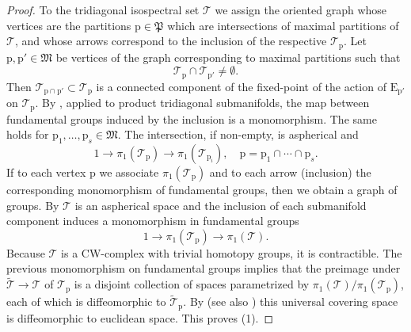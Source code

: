 \documentclass[reqno]{amsart}
\newcommand{\p}{\mathrm{p}}
\newcommand{\cT}{\mathcal{T}}
\newcommand{\E}{\mathrm{E}}
\begin{document}
\begin{proof}
To the tridiagonal isospectral set $\cT$ we assign the oriented graph whose vertices are the partitions $\p\in \mathfrak{P}$ which are intersections of maximal partitions of $\cT$, and whose arrows correspond to the inclusion of the respective $\cT_\p$.
Let $\p,\p'\in \mathfrak{M}$ be vertices of the graph corresponding to maximal partitions such that
\[\cT_{\p}\cap \cT_{\p'} \neq\emptyset.\]
Then $\cT_{\p\cap \p'}\subset \cT_\p$ is a connected component of the fixed-point
of the action of $\E_{\p'}$ on $\cT_\p$. By \cite[Lemma 7.1]{Da2}, applied to product tridiagonal submanifolds, the map between fundamental groups induced by the inclusion  is a monomorphism. The same holds for $\p_1,\dots,\p_s\in \mathfrak{M}$. The intersection, if non-empty, is aspherical
and
\[1\to \pi_1(\cT_\p)\to \pi_{1}(\cT_{\p_i}),\quad \p=\p_1\cap\cdots\cap \p_s.\]
If to each vertex $\p$ we associate $\pi_1(\cT_\p)$ and to each arrow (inclusion) the corresponding monomorphism of fundamental groups, then we obtain a graph of groups. By \cite[Theorem 1B.11]{Ha} $\cT$ is an aspherical space and the inclusion of each submanifold component induces a monomorphism in fundamental groups
\[1\to \pi_1(\cT_\p)\to \pi_{1}(\cT).\]
Because $\cT$ is a CW-complex with trivial homotopy groups, it is contractible. The previous monomorphism on fundamental groups
 implies that the preimage under $\widetilde{\cT}\to \cT$ of $\cT_\p$ is a disjoint collection of spaces parametrized by $\pi_1(\cT)/\pi_1(\cT_\p)$, each of which is diffeomorphic to $\widetilde{\cT}_\p$. By \cite[Theorem 3.3, Remark 3.4, and Example 4.4]{Da2} (see also  \cite[Section 5]{To}) this universal covering space is diffeomorphic to euclidean space. This proves (1).


\end{proof}
\end{document}
